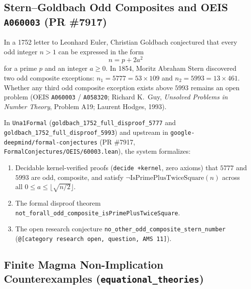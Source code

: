 \documentclass[11pt,a4paper]{article}
\begin{document}
\subsection{Stern--Goldbach Odd Composites and OEIS \texttt{A060003} (PR \#7917)}

In a 1752 letter to Leonhard Euler, Christian Goldbach conjectured that every odd integer $n > 1$ can be expressed in the form
\begin{equation}
  n = p + 2a^2
\end{equation}
for a prime $p$ and an integer $a \ge 0$. In 1854, Moritz Abraham Stern discovered two odd composite exceptions: $n_1 = 5777 = 53 \times 109$ and $n_2 = 5993 = 13 \times 461$. Whether any third odd composite exception exists above $5993$ remains an open problem (OEIS \texttt{A060003} / \texttt{A058320}; Richard K.\ Guy, \emph{Unsolved Problems in Number Theory}, Problem A19; Laurent Hodges, 1993).

In \texttt{Una1Formal} (\texttt{goldbach\_1752\_full\_disproof\_5777} and \texttt{goldbach\_1752\_full\_disproof\_5993}) and upstream in \texttt{google-deepmind/formal-conjectures} (PR \#7917, \texttt{FormalConjectures/OEIS/60003.lean}), the system formalizes:
\begin{enumerate}
    \item Decidable kernel-verified proofs (\texttt{decide +kernel}, zero axioms) that $5777$ and $5993$ are odd, composite, and satisfy $\neg \mathrm{IsPrimePlusTwiceSquare}(n)$ across all $0 \le a \le \lfloor\sqrt{n/2}\rfloor$.
    \item The formal disproof theorem \texttt{not\_forall\_odd\_composite\_isPrimePlusTwiceSquare}.
    \item The open research conjecture \texttt{no\_other\_odd\_composite\_stern\_number} (\texttt{@[category research open, question, AMS 11]}).
\end{enumerate}

\subsection{Finite Magma Non-Implication Counterexamples (\texttt{equational\_theories})}
\end{document}
